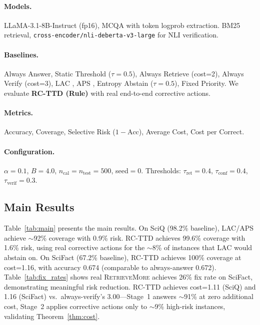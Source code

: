 \documentclass[letterpaper]{article}
\begin{document}
\paragraph{Models.}
LLaMA-3.1-8B-Instruct \cite{dubey2024llama3} (fp16), MCQA with token logprob extraction. BM25 \cite{robertson2009bm25} retrieval, \texttt{cross-encoder/nli-deberta-v3-large} \cite{he2021deberta} for NLI verification.

\paragraph{Baselines.}
Always Answer, Static Threshold ($\tau{=}0.5$), Always Retrieve (cost=2), Always Verify (cost=3), LAC \cite{sadinle2019least}, APS \cite{romano2020classification}, Entropy Abstain ($\tau{=}0.5$), Fixed Priority. We evaluate \textbf{RC-TTD (Rule)} with real end-to-end corrective actions.

\paragraph{Metrics.}
Accuracy, Coverage, Selective Risk ($1{-}\text{Acc}$), Average Cost, Cost per Correct.

\paragraph{Configuration.}
$\alpha{=}0.1$, $B{=}4.0$, $n_{\text{cal}}{=}n_{\text{test}}{=}500$, seed$=0$. Thresholds: $\tau_{\text{ret}}{=}0.4$, $\tau_{\text{conf}}{=}0.4$, $\tau_{\text{verif}}{=}0.3$.

\subsection{Main Results}

Table~\ref{tab:main} presents the main results. On SciQ (98.2\% baseline), LAC/APS achieve $\sim$92\% coverage with 0.9\% risk. RC-TTD achieves 99.6\% coverage with 1.6\% risk, using real corrective actions for the $\sim$8\% of instances that LAC would abstain on. On SciFact (67.2\% baseline), RC-TTD achieves 100\% coverage at cost=1.16, with accuracy 0.674 (comparable to always-answer 0.672). Table~\ref{tab:fix_rates} shows real \textsc{RetrieveMore} achieves 26\% fix rate on SciFact, demonstrating meaningful risk reduction. RC-TTD achieves cost=1.11 (SciQ) and 1.16 (SciFact) vs.\ always-verify's 3.00---Stage~1 answers $\sim$91\% at zero additional cost, Stage~2 applies corrective actions only to $\sim$9\% high-risk instances, validating Theorem~\ref{thm:cost}.
\end{document}
